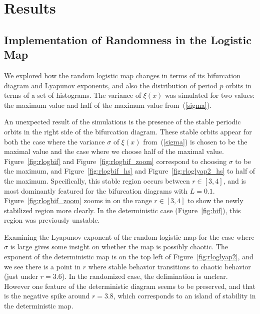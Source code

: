 \chapter{Results}
\section{Implementation of Randomness in the Logistic Map}
We explored how the random logistic map changes in terms of its
bifurcation diagram and Lyapunov exponents, and also the distribution
of period $p$ orbits in terms of a set of histograms. The variance of
$\xi(x)$ was simulated for two values: the maximum value and
half of the maximum value from~(\ref{sigma}).

An unexpected result of the simulations is the presence of the stable
periodic orbits in the right side of the bifurcation diagram. These
stable orbits appear for both the case where the variance $\sigma$ of
$\xi(x)$ from~(\ref{sigma}) is chosen to be the maximal value and the
case where we choose half of the maximal
value. Figure~\ref{fig:rlogbif} and Figure~\ref{fig:rlogbif_zoom}
correspond to choosing $\sigma$ to be the maximum, and
Figure~\ref{fig:rlogbif_hs} and Figure~\ref{fig:rloglyap2_hs} to half
of the maximum. Specifically, this stable region occurs between $r\in [3,4]$, and is most dominantly featured for the bifurcation
diagrams with $L=0.1$. Figure~\ref{fig:rlogbif_zoom} zooms in on the
range $r \in [3,4]$ to show the newly stabilized region more clearly. In the
deterministic case (Figure~\ref{fig:bif}), this region was previously
unstable. 

Examining the Lyapunov exponent of the random logistic
map for the case where $\sigma$ is large gives some insight on whether
the map is possibly chaotic. The exponent of the deterministic map is
on the top left of Figure~\ref{fig:rloglyap2}, and we see there is a
point in $r$ where stable behavior transitions to chaotic behavior (just under $r=3.6$). In the randomized case, the
delimination is unclear. However one feature of the deterministic
diagram seems to be preserved, and that is the negative spike around
$r=3.8$, which corresponds to an island of stability in the
deterministic map.

